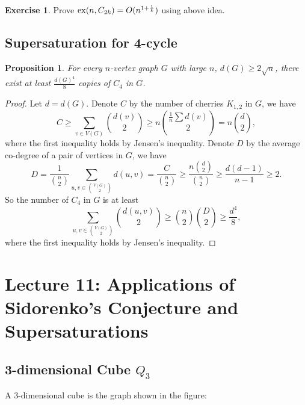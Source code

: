 \documentclass{article}
\newtheorem{proposition}[theorem]{Proposition}
\theoremstyle{definition}
\newtheorem{exercise}[theorem]{Exercise}
\begin{document}
\begin{exercise}
    Prove ${\rm ex}(n,C_{2k})=O(n^{1+\frac{1}{k}})$ using above idea.
\end{exercise}

\subsection{Supersaturation for 4-cycle}

\begin{proposition}
    For every $n$-vertex graph $G$ with large $n$, $d(G)\geq 2\sqrt{n}$, there exist at least $\frac{d(G)^4}{8}$ copies of $C_4$ in $G$.
\end{proposition}

\begin{proof}
Let $d=d(G)$. Denote $C$ by the number of cherries $K_{1,2}$ in $G$, we have $$C\geq \sum_{v\in V(G)} \binom{d(v)}{2} \geq n        \binom{\frac{1}{n}\sum d(v)}{2} =n \binom{d}{2},$$ where the first inequality holds by Jensen's inequality. Denote $D$ by the average co-degree of a pair of vertices in $G$, we have
$$ D =\frac{1}{\binom{n}{2}} \sum_{u,v\in \binom{V(G)}{2}}d(u,v) =\frac{C}{\binom{n}{2}} \geq \frac{n\binom{d}{2}}{\binom{n}{2}} \geq \frac{d(d-1)}{n-1} \geq 2.
$$
So the number of $C_4$ in $G$ is at least $$ \sum_{u,v\in \binom{V(G)}{2}}\binom{d(u,v)}{2} \geq \binom{n}{2} \binom{D}{2} \geq \frac{d^4}{8},$$
where the first inequality holds by Jensen's inequality.
\end{proof}


\newpage

\section{Lecture 11: Applications of Sidorenko's Conjecture and Supersaturations}

\subsection{3-dimensional Cube $Q_{3}$}

A 3-dimensional cube is the graph shown in the figure:
\end{document}
